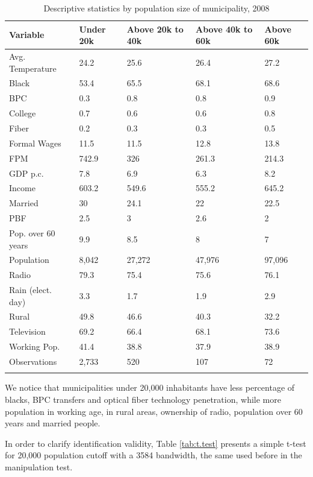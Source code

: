 \documentclass[
  12pt,
]{article}
\begin{document}
\begin{table}[!h]

\caption{\label{tab:desc.2008}Descriptive statistics by population size of municipality, 2008}
\centering
\fontsize{9}{11}\selectfont
\begin{tabu} to 
\toprule
Variable & Under 20k & Above 20k to 40k & Above 40k to 60k & Above 60k\\
\midrule
Avg. Temperature & 24.2 & 25.6 & 26.4 & 27.2\\
Black & 53.4 & 65.5 & 68.1 & 68.6\\
BPC & 0.3 & 0.8 & 0.8 & 0.9\\
College & 0.7 & 0.6 & 0.6 & 0.8\\
Fiber & 0.2 & 0.3 & 0.3 & 0.5\\
Formal Wages & 11.5 & 11.5 & 12.8 & 13.8\\
FPM & 742.9 & 326 & 261.3 & 214.3\\
GDP p.c. & 7.8 & 6.9 & 6.3 & 8.2\\
Income & 603.2 & 549.6 & 555.2 & 645.2\\
Married & 30 & 24.1 & 22 & 22.5\\
PBF & 2.5 & 3 & 2.6 & 2\\
Pop. over 60 years & 9.9 & 8.5 & 8 & 7\\
Population & 8,042 & 27,272 & 47,976 & 97,096\\
Radio & 79.3 & 75.4 & 75.6 & 76.1\\
Rain (elect. day) & 3.3 & 1.7 & 1.9 & 2.9\\
Rural & 49.8 & 46.6 & 40.3 & 32.2\\
Television & 69.2 & 66.4 & 68.1 & 73.6\\
Working Pop. & 41.4 & 38.8 & 37.9 & 38.9\\
Observations & 2,733 & 520 & 107 & 72\\
\bottomrule
{}\\
\end{tabu}
\end{table}

We notice that municipalities under 20,000 inhabitants have less
percentage of blacks, BPC transfers and optical fiber technology
penetration, while more population in working age, in rural areas,
ownership of radio, population over 60 years and married people.

In order to clarify identification validity, Table \ref{tab:t.test}
presents a simple t-test for 20,000 population cutoff with a 3584
bandwidth, the same used before in the manipulation test.
\end{document}
